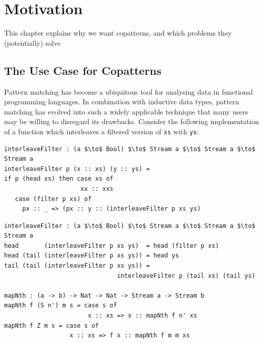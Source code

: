 \chapter{Motivation}
This chapter explains why we want copatterns, and which problems they (potentially) solve

\section{The Use Case for Copatterns}
\label{sec:motivation_copatterns}

Pattern matching has become a ubiquitous tool for analysing data in functional
programming languages. In combination with inductive data types, pattern
matching has evolved into such a widely applicable technique that many users may
be willing to disregard its drawbacks. Consider the following implementation of
a function which interleaves a filtered version of \texttt{xs} with \texttt{ys}:
\begin{lstlisting}[mathescape]
interleaveFilter : (a $\to$ Bool) $\to$ Stream a $\to$ Stream a $\to$ Stream a
interleaveFilter p (x :: xs) (y :: ys) = 
if p (head xs) then case xs of 
                     xx :: xxs 
   case (filter p xs) of
     px :: _ => (px :: y :: (interleaveFilter p xs ys)
\end{lstlisting}
\begin{lstlisting}[mathescape]
interleaveFilter : (a $\to$ Bool) $\to$ Stream a $\to$ Stream a $\to$ Stream a
head       (interleaveFilter p xs ys)  = head (filter p xs)
head (tail (interleaveFilter p xs ys)) = head ys
tail (tail (interleaveFilter p xs ys)) = 
                               interleaveFilter p (tail xs) (tail ys)

mapNth : (a -> b) -> Nat -> Nat -> Stream a -> Stream b
mapNth f (S n') m s = case s of
                       x :: xs => x :: mapNth f n' xs
mapNth f Z m s = case s of
                  x :: xs => f x :: mapNth f m m xs

\end{lstlisting}


